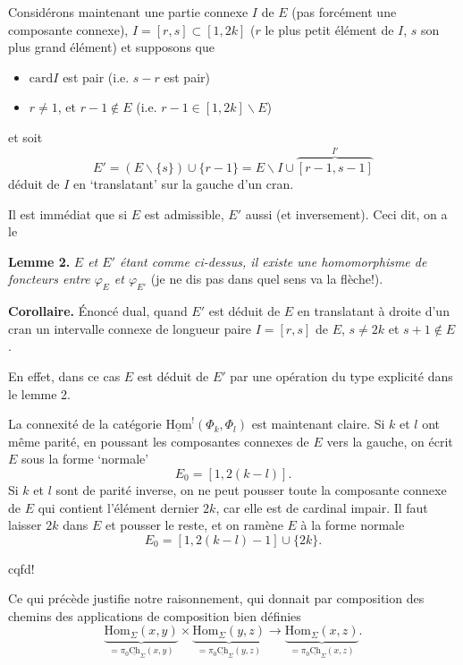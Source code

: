 \documentclass[11pt]{article}
\newcommand{\printedpage}[1]{\marginpar{\footnotesize p.~#1}}
\newcommand{\msp}[1]{\marginpar{\footnotesize [#1]}}
\newcommand{\uHom}{\underline{\mathrm{Hom}}}
\newcommand{\Hom}{\mathrm{Hom}}
\newcommand{\uCh}{\underline{\mathrm{Ch}}}
\newcommand{\card}{\mathrm{card}}
\begin{document}
Considérons maintenant une partie connexe $I$ de $E$ (pas forcément une composante connexe), $I=[r,s]\subset[1,2k]$ ($r$ le plus petit élément de $I$, $s$ son plus grand élément) et supposons que

\begin{itemize}
\item[a)] $\card I$ est pair (i.e. $s-r$ est pair)
\item[b)] $r\neq1$, et $r-1\notin E$ (i.e. $r-1\in[1,2k]\backslash E$)
\end{itemize}

et soit
\[
E'=(E\backslash\{s\})\cup\{r-1\}=E\backslash I\cup\overbrace{[r-1,s-1]}^{I'}
\]
déduit de $I$ en `translatant' sur la gauche d'un cran.

\msp{page 21}
Il est immédiat que si $E$ est admissible, $E'$ aussi (et inversement). Ceci dit, on a le

\textbf{Lemme 2.} \textit{$E$ et $E'$ étant comme ci-dessus, il existe une homomorphisme de foncteurs entre $\varphi_E$ et $\varphi_{E'}$} (je ne dis pas dans quel sens va la flèche!). %

\textbf{Corollaire.} Énoncé dual, quand $E'$ est déduit de $E$ en translatant à droite d'un cran un intervalle connexe de longueur paire $I=[r,s]$ de $E$, $s\neq2k$ et $s+1\notin E$.

En effet, dans ce cas $E$ est déduit de $E'$ par une opération du type explicité dans le lemme 2.

La connexité de la catégorie $\uHom^{!}(\Phi_k,\Phi_l)$ est maintenant claire. Si $k$ et $l$ ont même parité, en poussant les composantes connexes de $E$ vers la gauche, on écrit $E$ sous la forme `normale'
\[
E_0=[1,2(k-l)].
\]
Si $k$ et $l$ sont de parité inverse, on ne peut pousser toute la composante connexe de $E$ qui contient l'élément dernier $2k$, car elle est de cardinal impair. Il faut laisser $2k$ dans $E$ et pousser le reste, et on ramène $E$ à la forme normale
\[
E_0=[1,2(k-l)-1]\cup\{2k\}.
\]

\hfill cqfd!


\printedpage{14}
Ce qui précède justifie notre raisonnement, qui donnait par composition des chemins des applications de composition bien définies
\[
\underbrace{\Hom_\Sigma(x,y)}_{=\pi_0\uCh_\Sigma(x,y)} \times \underbrace{\Hom_\Sigma(y,z)}_{=\pi_0\uCh_\Sigma(y,z)} \longrightarrow \underbrace{\Hom_\Sigma(x,z)}_{=\pi_0\underline{\textstyle\mathrm{Ch}}_\Sigma(x,z)}.
\]
\end{document}
